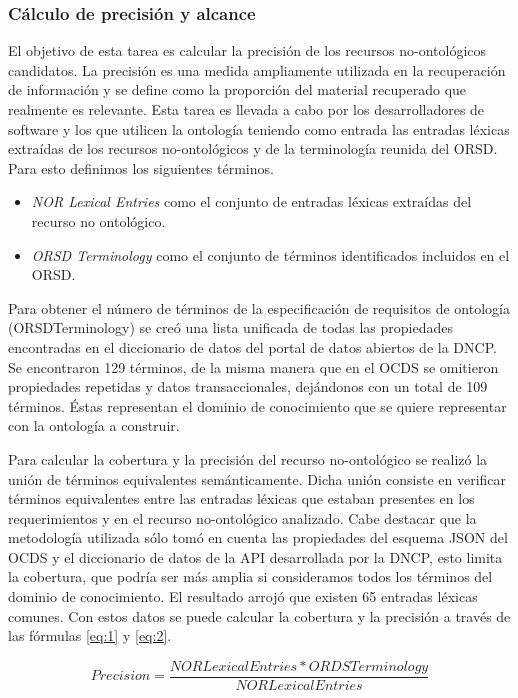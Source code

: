 \subsubsection{Cálculo de precisión y alcance}

El objetivo de esta tarea es calcular la precisión de los recursos no-ontológicos candidatos. La precisión es una medida ampliamente utilizada en la recuperación de información y se define como la proporción del material recuperado que realmente es relevante. Esta tarea es llevada a cabo por los desarrolladores de software y los que utilicen la ontología teniendo como entrada las entradas léxicas extraídas de los recursos no-ontológicos y de la terminología reunida del ORSD. Para esto definimos los siguientes términos.

\begin{itemize}
    \item \textit{NOR Lexical Entries}  como el conjunto de entradas léxicas extraídas del recurso no ontológico.	
    \item \textit{ORSD Terminology} como el conjunto de términos identificados incluidos en el ORSD. 
\end{itemize}
Para obtener el número de términos de la especificación de requisitos de ontología (ORSDTerminology) se creó una lista unificada de todas las propiedades encontradas en el diccionario de datos del portal de datos abiertos de la DNCP.  Se encontraron 129 términos, de la misma manera que en el OCDS se omitieron propiedades repetidas y datos transaccionales, dejándonos con un total de 109 términos. Éstas representan el dominio de conocimiento que se quiere representar con la ontología a construir.

Para calcular la cobertura y la precisión del recurso no-ontológico se realizó la unión de términos equivalentes semánticamente. Dicha unión consiste en verificar términos equivalentes entre las entradas léxicas que estaban presentes en los requerimientos y en el recurso no-ontológico analizado. Cabe destacar que la metodología utilizada sólo tomó en cuenta las propiedades del esquema JSON del OCDS y el diccionario de datos de la API desarrollada por la DNCP, esto limita la cobertura, que podría ser más amplia si consideramos todos los términos del dominio de conocimiento. El resultado arrojó que existen 65 entradas léxicas comunes. Con estos datos se puede calcular la cobertura y la precisión a través de las  fórmulas \ref{eq:1} y \ref{eq:2}.

\begin{equation}
    \label{eq:1}
    Precision =  \frac{{NORLexicalEntries}*{ORDSTerminology} }{{NORLexicalEntries}}    
\end{equation}

